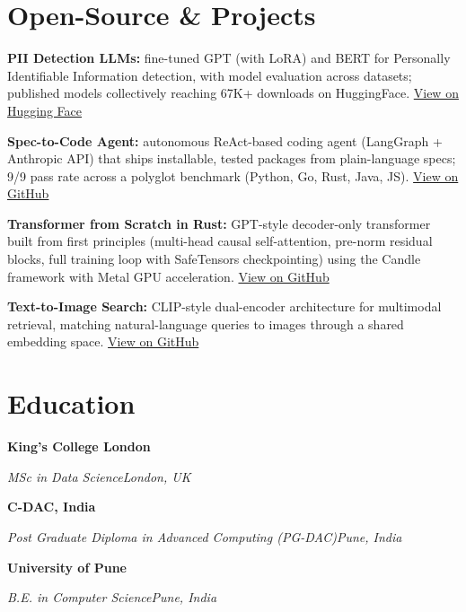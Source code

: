 \documentclass[10pt,a4paper]{article}
\newcommand{\entry}[4]{%
  {\color{company}\bfseries #1}\hfill {\color{muted}#2}\par
  \vspace{1pt}
  {\itshape #3}\hfill {\color{muted}\itshape #4}\par
  \vspace{3pt}%
}
\begin{document}
\section{Open-Source \& Projects}
\begin{tight}
  \item \textbf{PII Detection LLMs:} fine-tuned GPT (with LoRA) and BERT for Personally Identifiable Information detection, with model evaluation across datasets; published models collectively reaching 67K+ downloads on HuggingFace. \href{https://huggingface.co/ab-ai/pii_model}{View on Hugging Face}
  \item \textbf{Spec-to-Code Agent:} autonomous ReAct-based coding agent (LangGraph + Anthropic API) that ships installable, tested packages from plain-language specs; 9/9 pass rate across a polyglot benchmark (Python, Go, Rust, Java, JS). \href{https://github.com/abhijeetscode/Spec-to-Code-Agent}{View on GitHub}
  \item \textbf{Transformer from Scratch in Rust:} GPT-style decoder-only transformer built from first principles (multi-head causal self-attention, pre-norm residual blocks, full training loop with SafeTensors checkpointing) using the Candle framework with Metal GPU acceleration. \href{https://github.com/abhijeetscode/transformer-rust}{View on GitHub}
  \item \textbf{Text-to-Image Search:} CLIP-style dual-encoder architecture for multimodal retrieval, matching natural-language queries to images through a shared embedding space. \href{https://github.com/abhijeetscode/text-to-image-search}{View on GitHub}
\end{tight}

\section{Education}
\entry{King's College London}{}{MSc in Data Science}{London, UK}
\vspace{-3pt}
\entry{C-DAC, India}{}{Post Graduate Diploma in Advanced Computing (PG-DAC)}{Pune, India}
\vspace{-3pt}
\entry{University of Pune}{}{B.E. in Computer Science}{Pune, India}
\end{document}
